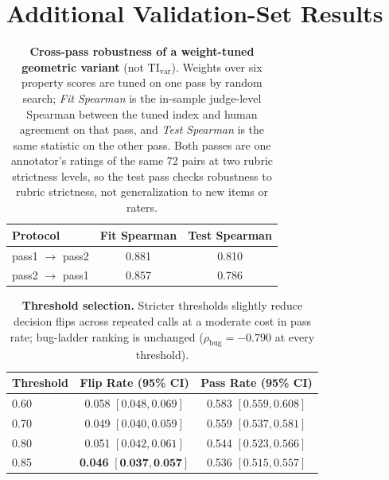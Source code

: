 \section{Additional Validation-Set Results}\label{app:moved-results}

\begin{table}[h]
  \centering
  \small
  \begin{tabular}{lcc}
    \toprule
    \textbf{Protocol}           & \textbf{Fit Spearman} & \textbf{Test Spearman} \\
    \midrule
    pass1 \(\rightarrow\) pass2 & 0.881                 & 0.810                  \\
    pass2 \(\rightarrow\) pass1 & 0.857                 & 0.786                  \\
    \bottomrule
  \end{tabular}
  \caption{\textbf{Cross-pass robustness of a weight-tuned geometric variant} (not \(\mathrm{TI}_{\mathrm{var}}\)).
  Weights over six property scores are tuned on one pass by random search; \emph{Fit Spearman} is the in-sample judge-level Spearman between the tuned index and human agreement on that pass, and \emph{Test Spearman} is the same statistic on the other pass.
  Both passes are one annotator's ratings of the same 72 pairs at two rubric strictness levels, so the test pass checks robustness to rubric strictness, not generalization to new items or raters.}
  \label{tab:cross_pass_generalization}
\end{table}

\begin{table}[h]
  \centering
  \small
  \begin{tabular}{lcc}
    \toprule
    \textbf{Threshold} & \textbf{Flip Rate (95\% CI)}                        & \textbf{Pass Rate (95\% CI)} \\
    \midrule
    0.60               & 0.058 \([0.048, 0.069]\)                            & 0.583 \([0.559, 0.608]\)     \\
    0.70               & 0.049 \([0.040, 0.059]\)                            & 0.559 \([0.537, 0.581]\)     \\
    0.80               & 0.051 \([0.042, 0.061]\)                            & 0.544 \([0.523, 0.566]\)     \\
    0.85               & \textbf{0.046} \([\textbf{0.037}, \textbf{0.057}]\) & 0.536 \([0.515, 0.557]\)     \\
    \bottomrule
  \end{tabular}
  \caption{\textbf{Threshold selection.} Stricter thresholds slightly reduce decision flips across repeated calls at a moderate cost in pass rate; bug-ladder ranking is unchanged (\(\rho_{\text{bug}}=-0.790\) at every threshold).}
  \label{tab:exp13_threshold_sweep}
\end{table}

